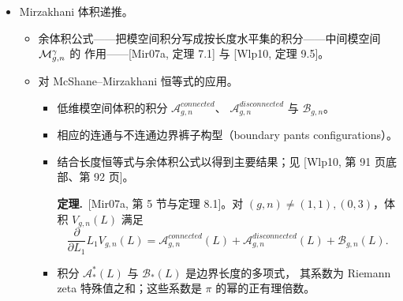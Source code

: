 \begin{itemize}[leftmargin=1.6em,itemsep=2pt,topsep=2pt]
\item Mirzakhani 体积递推。
  \begin{itemize}[leftmargin=1.6em,itemsep=2pt,topsep=2pt]
  \item 余体积公式——把模空间积分写成按长度水平集的积分——中间模空间 $\mathcal{M}_{g,n}^\gamma$ 的
    作用——[Mir07a, 定理 7.1] 与 [Wlp10, 定理 9.5]。
  \item 对 McShane--Mirzakhani 恒等式的应用。
    \begin{itemize}[leftmargin=1.6em,itemsep=2pt,topsep=2pt]
    \item 低维模空间体积的积分 $\mathcal{A}^{connected}_{g,n}$、
      $\mathcal{A}^{disconnected}_{g,n}$ 与 $\mathcal{B}_{g,n}$。
    \item 相应的连通与不连通边界裤子构型（boundary pants configurations）。
    \item 结合长度恒等式与余体积公式以得到主要结果；见 [Wlp10, 第 91 页底部、第 92 页]。

      \textbf{定理.}\ [Mir07a, 第 5 节与定理 8.1]。对 $(g,n)\neq(1,1),(0,3)$，体积
      $V_{g,n}(L)$ 满足
      \[
      \frac{\partial}{\partial L_1}L_1V_{g,n}(L)
      =\mathcal{A}^{connected}_{g,n}(L)+\mathcal{A}^{disconnected}_{g,n}(L)
      +\mathcal{B}_{g,n}(L).
      \]
    \item 积分 $\mathcal{A}^{*}_{*}(L)$ 与 $\mathcal{B}_{*}(L)$ 是边界长度的多项式，
      其系数为 Riemann zeta 特殊值之和；这些系数是 $\pi$ 的幂的正有理倍数。
    \end{itemize}
  \end{itemize}


\end{itemize}
